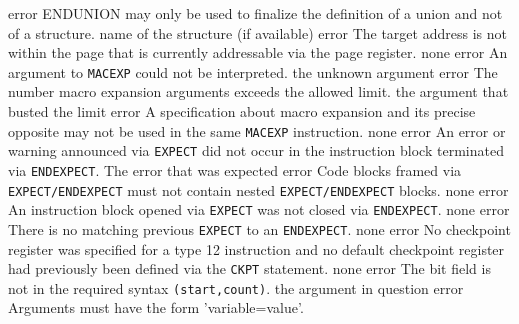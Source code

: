 \documentclass[12pt,twoside]{report}
\newcommand{\tty}[1]{{\tt #1}}
\begin{document}
\begin{description}
               {error}
               {ENDUNION may only be used to finalize the definition
                of a union and not of a structure.}
               {name of the structure (if available)}
               {error}
               {The target address is not within the page
                that is currently addressable via the page
                register.}
               {none}
               {error}
               {An argument to \tty{MACEXP} could not be
                interpreted.}
               {the unknown argument}
               {error}
               {The number macro expansion arguments exceeds the allowed limit.}
               {the argument that busted the limit}
               {error}
               {A specification about macro expansion and its
                precise opposite may not be used in the same
                \tty{MACEXP} instruction.}
               {none}
               {error}
               {An error or warning announced via {\tt EXPECT} did not occur in the
                instruction block terminated via {\tt ENDEXPECT}.}
               {The error that was expected}
               {error}
               {Code blocks framed via {\tt EXPECT/ENDEXPECT} must not contain
                nested {\tt EXPECT/ENDEXPECT} blocks.}
               {none}
               {error}
               {An instruction block opened via {\tt EXPECT} was not closed via
                {\tt ENDEXPECT}.}
               {none}
               {error}
               {There is no matching previous {\tt EXPECT} to an {\tt ENDEXPECT}.}
               {none}
               {error}
               {No checkpoint register was specified for a type 12 instruction
                and no default checkpoint register had previously been defined
                via the {\tt CKPT} statement.}
               {none}
               {error}
               {The bit field is not in the required syntax {\tt (start,count)}.}
               {the argument in question}
               {error}
               {Arguments must have the form 'variable=value'.}

\end{description}
\end{document}
